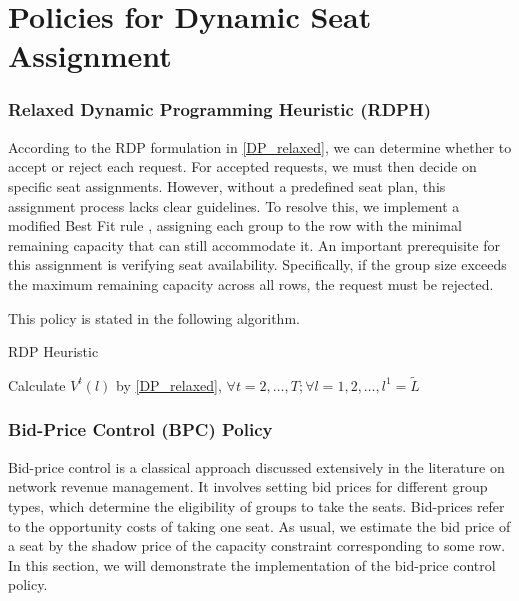 \section{Policies for Dynamic Seat Assignment}\label{policies}

\subsubsection*{Relaxed Dynamic Programming Heuristic (RDPH)}

According to the RDP formulation in \eqref{DP_relaxed}, we can determine whether to accept or reject each request. For accepted requests, we must then decide on specific seat assignments. However, without a predefined seat plan, this assignment process lacks clear guidelines. To resolve this, we implement a modified Best Fit rule \cite{johnson1974fast}, assigning each group to the row with the minimal remaining capacity that can still accommodate it. An important prerequisite for this assignment is verifying seat availability. Specifically, if the group size exceeds the maximum remaining capacity across all rows, the request must be rejected.

This policy is stated in the following algorithm.

\begin{algorithm}[H]
  \caption{RDP Heuristic}\label{algo_dp_heuris}
  Calculate $V^{t}(l)$ by \eqref{DP_relaxed}, $\forall t =2, \ldots, T; \forall l = 1, 2, \ldots, l^{1}=\tilde{L}$\;
\end{algorithm}

\subsubsection*{Bid-Price Control (BPC) Policy}
Bid-price control is a classical approach discussed extensively in the literature on network revenue management. It involves setting bid prices for different group types, which determine the eligibility of groups to take the seats. Bid-prices refer to the opportunity costs of taking one seat. As usual, we estimate the bid price of a seat by the shadow price of the capacity constraint corresponding to some row. In this section, we will demonstrate the implementation of the bid-price control policy. 

